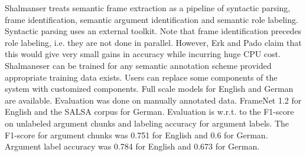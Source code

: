 \documentclass{llncs}
\begin{document}
Shalmanser treats semantic frame extraction  as a pipeline 
of syntactic parsing, frame identification, semantic argument identification and semantic role labeling.
Syntactic parsing uses an external toolkit. 
Note that frame identification precedes role labeling, i.e. they are not done in parallel.
However, Erk and Pado \cite{Erk2006} claim that this would give very small gains in
accuracy while incurring huge CPU cost. 
Shalmaneser can be trained for any semantic annotation scheme
provided appropriate training data exists.
Users can replace some components of the system with customized
components.
Full scale models for English and German are available.
Evaluation was done on manually annotated data. FrameNet 1.2 for English and
the SALSA corpus for German. 
Evaluation is w.r.t. to the F1-score on unlabeled argument chunks and labeling accuracy for
argument labels. The F1-score for argument chunks was 0.751 for English and 0.6 for
German. Argument label accuracy was 0.784 for English and 0.673 for
German.
\end{document}
